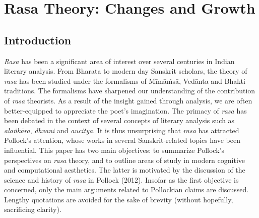 \chapter[Rasa Theory: Changes and Growth]{Rasa Theory: Changes and Growth}\label{chapter\thechapter:begin}

\section*{Introduction}

\textsl{Rasa} has been a significant area of interest over several centuries in Indian literary analysis. From Bharata to modern day Sanskrit scholars, the theory of \textsl{rasa} has been studied under the formalisms of Mīmāṁsā, Vedānta and Bhakti traditions. The formalisms have sharpened our understanding of the contribution of \textsl{rasa} theorists. As a result of the insight gained through analysis, we are often better-equipped to appreciate the poet’s imagination. The primacy of \textsl{rasa} has been debated in the context of several concepts of literary analysis such as \textsl{alaṅkāra}, \textsl{dhvani} and \textsl{aucitya}. It is thus unsurprising that \textsl{rasa }has attracted Pollock’s attention, whose works in several Sanskrit-related topics have been influential. This paper has two main objectives: to summarize Pollock’s perspectives on \textsl{rasa} theory, and to outline areas of study in modern cognitive and computational aesthetics. The latter is motivated by the discussion of the science and history of \textsl{rasa} in Pollock (2012). Insofar as the first objective is concerned, only the main arguments related to Pollockian claims are discussed. Lengthy quotations are avoided for the sake of brevity (without hopefully, sacrificing clarity). 

